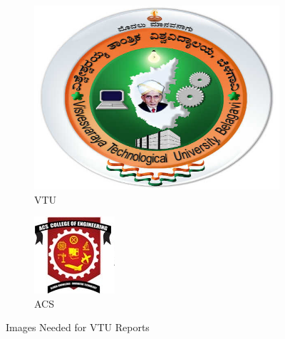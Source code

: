 \documentclass{article}
\begin{document}
	\begin{figure}
		\centering
		\begin{subfigure}{0.46\linewidth}
			\includegraphics[width=\linewidth]{vtu.png}
			\caption{VTU}
			\label{fig:subfig1}
		\end{subfigure}
		\hfill
		\begin{subfigure}{0.44\linewidth}
			\includegraphics[width=\linewidth]{acs.png}
			\caption{ACS}
			\label{fig:subfig2}
		\end{subfigure}
		\caption{Images Needed for VTU Reports}
		\label{fig:subfigures}
	\end{figure}
\end{document}
